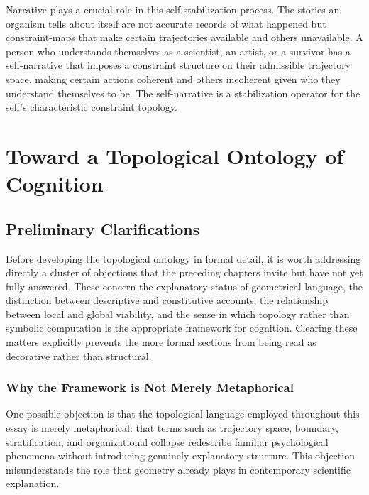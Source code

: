 \documentclass[12pt,a4paper]{report}
\theoremstyle{flyxion}
\begin{document}
Narrative plays a crucial role in this self-stabilization process. The stories an organism tells about itself are not accurate records of what happened but constraint-maps that make certain trajectories available and others unavailable. A person who understands themselves as a scientist, an artist, or a survivor has a self-narrative that imposes a constraint structure on their admissible trajectory space, making certain actions coherent and others incoherent given who they understand themselves to be. The self-narrative is a stabilization operator for the self's characteristic constraint topology.

\chapter{Toward a Topological Ontology of Cognition}

\section{Preliminary Clarifications}

Before developing the topological ontology in formal detail, it is worth addressing directly a cluster of objections that the preceding chapters invite but have not yet fully answered. These concern the explanatory status of geometrical language, the distinction between descriptive and constitutive accounts, the relationship between local and global viability, and the sense in which topology rather than symbolic computation is the appropriate framework for cognition. Clearing these matters explicitly prevents the more formal sections from being read as decorative rather than structural.

\subsection*{Why the Framework is Not Merely Metaphorical}

One possible objection is that the topological language employed throughout this essay is merely metaphorical: that terms such as trajectory space, boundary, stratification, and organizational collapse redescribe familiar psychological phenomena without introducing genuinely explanatory structure. This objection misunderstands the role that geometry already plays in contemporary scientific explanation.
\end{document}
